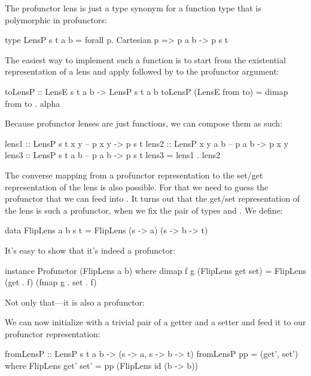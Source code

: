 \documentclass[DaoFP]{subfiles}
\begin{document}
The profunctor lens is just a type synonym for a function type that is polymorphic in  profunctors:
\begin{haskell}
type LensP s t a b = forall p. Cartesian p => p a b -> p s t
\end{haskell}

The easiest way to implement such a function is to start from the existential representation of a lens and apply  followed by  to the profunctor argument:
\begin{haskell}
toLensP :: LensE s t a b -> LensP s t a b
toLensP (LensE from to) = dimap from to . alpha
\end{haskell}

Because profunctor lenses are just functions, we can compose them as such:
\begin{haskell}
lens1 :: LensP s t x y 
-- p x y -> p s t
lens2 :: LensP x y a b 
-- p a b -> p x y
lens3 :: LensP s t a b 
-- p a b -> p s t
lens3 = lens1 . lens2
\end{haskell}

The converse mapping from a profunctor representation to the set/get representation of the lens is also possible. For that we need to guess the profunctor that we can feed into . It turns out that the get/set representation of the lens is such a profunctor, when we fix the pair of types  and . We define:
\begin{haskell}
data FlipLens a b s t = FlipLens (s -> a) (s -> b -> t)
\end{haskell}
It's easy to show that it's indeed a profunctor:
\begin{haskell}
instance Profunctor (FlipLens a b) where
  dimap f g (FlipLens get set) = FlipLens (get . f) (fmap g . set . f)
\end{haskell}
Not only that---it is also a  profunctor:
We can now initialize  with a trivial pair of a getter and a setter and feed it to our profunctor representation:
\begin{haskell}
fromLensP :: LensP s t a b -> (s -> a, s -> b -> t)
fromLensP pp = (get', set')
  where FlipLens get' set' = pp (FlipLens id (\s b -> b))
\end{haskell}
\end{document}
